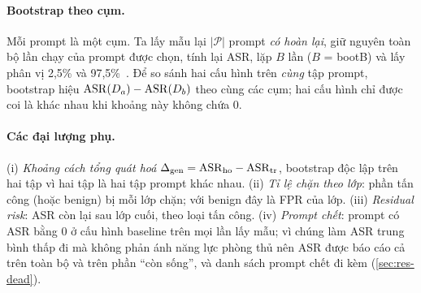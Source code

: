 \paragraph{Bootstrap theo cụm.} Mỗi prompt là một cụm. Ta lấy mẫu lại $|\mathcal{P}|$ prompt \emph{có hoàn lại}, giữ nguyên toàn bộ lần chạy của prompt được chọn, tính lại ASR, lặp $B$ lần ($B$ = \num{bootB}) và lấy phân vị 2,5\% và 97,5\%~\citep{efron1979bootstrap}. Để so sánh hai cấu hình trên \emph{cùng} tập prompt, bootstrap hiệu $\mathrm{ASR}(D_a)-\mathrm{ASR}(D_b)$ theo cùng các cụm; hai cấu hình chỉ được coi là khác nhau khi khoảng này không chứa 0.

\paragraph{Các đại lượng phụ.} (i) \emph{Khoảng cách tổng quát hoá} $\Delta_{\mathrm{gen}}=\mathrm{ASR}_{\mathrm{ho}}-\mathrm{ASR}_{\mathrm{tr}}$, bootstrap độc lập trên hai tập vì hai tập là hai tập prompt khác nhau. (ii) \emph{Tỉ lệ chặn theo lớp}: phần tấn công (hoặc benign) bị mỗi lớp chặn; với benign đây là FPR của lớp. (iii) \emph{Residual risk}: ASR còn lại sau lớp cuối, theo loại tấn công. (iv) \emph{Prompt chết}: prompt có ASR bằng 0 ở cấu hình baseline trên mọi lần lấy mẫu; vì chúng làm ASR trung bình thấp đi mà không phản ánh năng lực phòng thủ nên ASR được báo cáo cả trên toàn bộ và trên phần ``còn sống'', và danh sách prompt chết đi kèm (\cref{sec:res-dead}).

